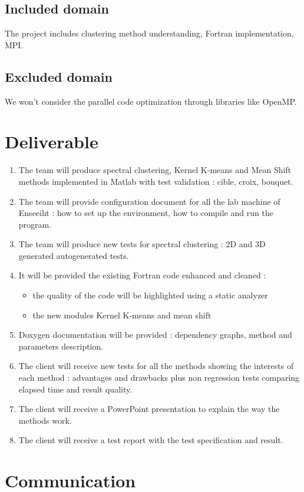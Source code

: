 \documentclass[12pt]{article} %
\begin{document}
\subsection{Included domain}
The project includes clustering method understanding, Fortran implementation, MPI.
\subsection{Excluded domain} 
We won't consider the parallel code optimization through libraries like OpenMP.

\section{Deliverable}
\begin{enumerate}
\item The team will produce spectral clustering, Kernel K-means and Mean Shift methods implemented in  Matlab with test validation : cible, croix, bouquet.
\item The team will provide configuration document for all the lab machine of Enseeiht : how to set up the environment, how to compile and run the program.
\item The team will produce new tests for spectral clustering  : 2D and 3D generated autogenerated tests.
\item It will be provided the existing Fortran code enhanced and cleaned :
	\begin{itemize}
	\item the quality of the code will be highlighted using a static analyzer
	\item the new modules Kernel K-means and mean shift
	\end{itemize}
\item Doxygen documentation will be provided : dependency graphs, method and parameters description.
\item The client will receive new tests for all the methods showing the interests of each method : advantages and drawbacks plus non regression tests comparing elapsed time and result quality.
\item The client will receive a PowerPoint presentation to explain the way the methods work.
\item The client will receive a test report with the test specification and result.
\end{enumerate}

\section{Communication}
\end{document}
